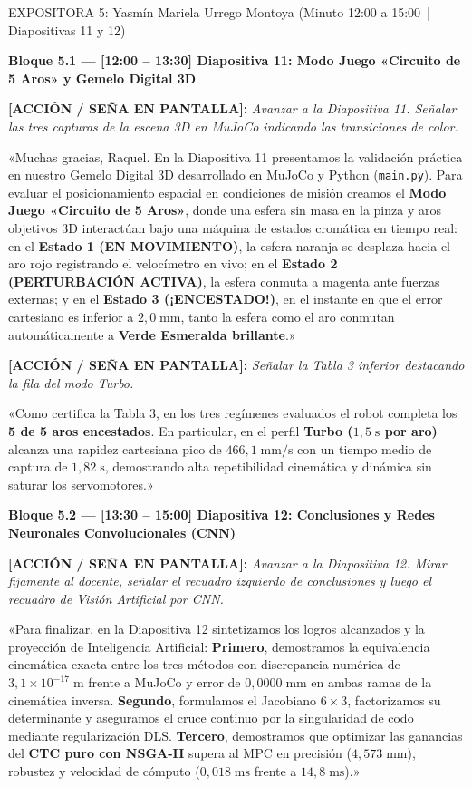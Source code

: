 \documentclass[11pt,a4paper]{article}
\newcommand{\accion}[1]{%
  \par\smallskip\noindent%
  {\color{uniGranate}\textbf{[ACCIÓN / SEÑA EN PANTALLA]:}} {\itshape\color{uniAzul!90!black} #1}\par\smallskip%
}
\newcommand{\speech}[1]{%
  \noindent{\color{verdeOk!85!black}\textbf{[SPEECH]:}} «#1»\par\medskip%
}
\begin{document}
\begin{cajaexpositor}[morado]{EXPOSITORA 5: Yasmín Mariela Urrego Montoya (Minuto 12:00 a 15:00 \,|\, Diapositivas 11 y 12)}

\textbf{\color{morado}Bloque 5.1 --- [12:00 -- 13:30] Diapositiva 11: Modo Juego «Circuito de 5 Aros» y Gemelo Digital 3D}
\accion{Avanzar a la Diapositiva 11. Señalar las tres capturas de la escena 3D en MuJoCo indicando las transiciones de color.}
\speech{Muchas gracias, Raquel. En la Diapositiva 11 presentamos la validación práctica en nuestro Gemelo Digital 3D desarrollado en MuJoCo y Python (\texttt{main.py}). Para evaluar el posicionamiento espacial en condiciones de misión creamos el \textbf{Modo Juego «Circuito de 5 Aros»}, donde una esfera sin masa en la pinza y aros objetivos 3D interactúan bajo una máquina de estados cromática en tiempo real:
en el \textbf{Estado 1 (EN MOVIMIENTO)}, la esfera naranja se desplaza hacia el aro rojo registrando el velocímetro en vivo;
en el \textbf{Estado 2 (PERTURBACIÓN ACTIVA)}, la esfera conmuta a magenta ante fuerzas externas;
y en el \textbf{Estado 3 (¡ENCESTADO!)}, en el instante en que el error cartesiano es inferior a \textbf{$2{,}0\;\text{mm}$}, tanto la esfera como el aro conmutan automáticamente a \textbf{Verde Esmeralda brillante}.}

\accion{Señalar la Tabla 3 inferior destacando la fila del modo Turbo.}
\speech{Como certifica la Tabla 3, en los tres regímenes evaluados el robot completa los \textbf{5 de 5 aros encestados}. En particular, en el perfil \textbf{Turbo ($1{,}5\;\text{s}$ por aro)} alcanza una rapidez cartesiana pico de \textbf{$466{,}1\;\text{mm/s}$} con un tiempo medio de captura de \textbf{$1{,}82\;\text{s}$}, demostrando alta repetibilidad cinemática y dinámica sin saturar los servomotores.}

\textbf{\color{morado}Bloque 5.2 --- [13:30 -- 15:00] Diapositiva 12: Conclusiones y Redes Neuronales Convolucionales (CNN)}
\accion{Avanzar a la Diapositiva 12. Mirar fijamente al docente, señalar el recuadro izquierdo de conclusiones y luego el recuadro de Visión Artificial por CNN.}
\speech{Para finalizar, en la Diapositiva 12 sintetizamos los logros alcanzados y la proyección de Inteligencia Artificial:
\textbf{Primero}, demostramos la equivalencia cinemática exacta entre los tres métodos con discrepancia numérica de $3{,}1\times 10^{-17}\;\text{m}$ frente a MuJoCo y error de $0{,}0000\;\text{mm}$ en ambas ramas de la cinemática inversa.
\textbf{Segundo}, formulamos el Jacobiano $6\times 3$, factorizamos su determinante y aseguramos el cruce continuo por la singularidad de codo mediante regularización DLS.
\textbf{Tercero}, demostramos que optimizar las ganancias del \textbf{CTC puro con NSGA-II} supera al MPC en precisión ($4{,}573\;\text{mm}$), robustez y velocidad de cómputo ($0{,}018\;\text{ms}$ frente a $14{,}8\;\text{ms}$).}


\end{cajaexpositor}
\end{document}
